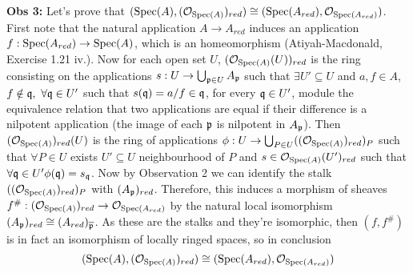 \begin{sol}
\begin{enumerate}[label=\alph*)]
		\textbf{Obs 3:} Let's prove that $(\mathrm{Spec}(A), (\mathcal{O}_{\mathrm{Spec}(A)})_{red}) \cong (\mathrm{Spec}(A_{red}), \mathcal{O}_{\mathrm{Spec}(A_{red})})$. First note that the natural application $A \to A_{red}$ induces an application $f: \mathrm{Spec}(A_{red}) \to \mathrm{Spec}(A)$, which is an homeomorphism (Atiyah-Macdonald, Exercise 1.21 iv.). Now for each open set $U$, $(\mathcal{O}_{\mathrm{Spec}(A)}(U))_{red}$ is the ring consisting on the applications $s: U \to \bigcup_{\mathfrak{p} \in U} A_{\mathfrak{p}}$ such that $\exists U' \subseteq U$ and $a,f \in A$, $f \notin \mathfrak{q}, \, \, \forall \mathfrak{q} \in U'$ such that $s(\mathfrak{q}) = a/f \in \mathfrak{q}$, for every $\mathfrak{q} \in U'$, module the equivalence relation that two applications are equal if their difference is a nilpotent application (the image of each $\mathfrak{p}$ is nilpotent in $A_{\mathfrak{p}}$). Then $(\mathcal{O}_{\mathrm{Spec}(A)})_{red}(U)$ is the ring of applications $\phi: U \to \bigcup_{P \in U} ((\mathcal{O}_{\mathrm{Spec}(A)})_{red})_P$ such that $\forall P \in U$ exists $U' \subseteq U$ neighbourhood of $P$ and $s \in \mathcal{O}_{\mathrm{Spec}(A)}(U')_{red}$ such that $\forall \mathfrak{q} \in U' \phi(\mathfrak{q}) = s_{\mathfrak{q}}$. Now by Observation 2 we can identify the stalk $((\mathcal{O}_{\mathrm{Spec}(A)})_{red})_P$ with $(A_{\mathfrak{p}})_{red}$. Therefore, this induces a morphism of sheaves $f^{\#}: (\mathcal{O}_{\mathrm{Spec}(A)})_{red} \to \mathcal{O}_{\mathrm{Spec}(A_{red})}$ by the natural local isomorphism $(A_{\mathfrak{p}})_{red} \cong (A_{red})_{\overline{\mathfrak{p}}}$. As these are the stalks and they're isomorphic, then $(f,f^{\#})$ is in fact an isomorphism of locally ringed spaces, so in conclusion 
		\[
			(\mathrm{Spec}(A), (\mathcal{O}_{\mathrm{Spec}(A)})_{red}) \cong (\mathrm{Spec}(A_{red}), \mathcal{O}_{\mathrm{Spec}(A_{red})})
		\]


\end{enumerate}
\end{sol}
